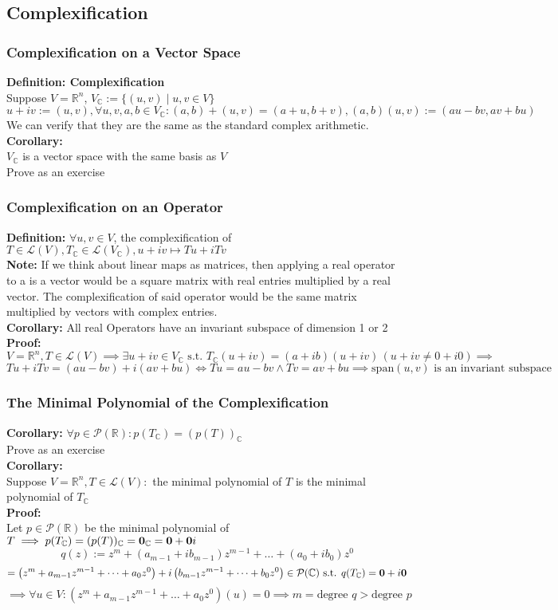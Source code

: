 \documentclass{article}
\newcommand{\R}{\mathbb{R}}
\newcommand{\st}{\mbox{ s.t. }}
\newcommand{\0}{{\bf{0}}}
\begin{document}
\subsection{Complexification}
\subsubsection{Complexification on a Vector Space}
\textbf{Definition: Complexification}\\
Suppose $V=\R^n$, $V_\mathbb{C}:=\{(u,v)\mid u,v\in V\}$
$$u+iv:=(u,v),\forall u,v,a,b\in V_\mathbb{C}:(a,b)+(u,v)=(a+u,b+v),(a,b)(u,v):=(au-bv,av+bu)$$
We can verify that they are the same as the standard complex arithmetic.\\
\textbf{Corollary:}\\
$V_\mathbb{C}$ is a vector space with the same basis as $V$\\
\null\hfill{Prove as an exercise}
\subsubsection{Complexification on an Operator}
\textbf{Definition:}
$\forall u,v\in V$, the complexification of $T\in\mathcal{L}(V),T_\mathbb{C}\in\mathcal{L}(V_\mathbb{C}),u+iv\mapsto Tu+iTv$\\
\textbf{Note:} If we think about linear maps as matrices, then applying a real operator to a is a vector would be a square matrix with real entries multiplied by a real vector. The complexification of said operator would be the same matrix multiplied by vectors with complex entries.\\
\textbf{Corollary: }All real Operators have an invariant subspace of dimension 1 or 2\\
\textbf{Proof:}
$$V=\R^n,T\in\mathcal{L}(V)\implies\exists u+iv\in V_\mathbb{C}\st T_\mathbb{C}(u+iv)=(a+ib)(u+iv)\,(u+iv\neq0+i0)\implies$$
$$Tu+iTv=(au-bv)+i(av+bu)\iff Tu=au-bv\land Tv=av+bu\implies\mbox{span}(u,v)\mbox{ is an invariant subspace}$$
\subsubsection{The Minimal Polynomial of the Complexification}
\textbf{Corollary:} $\forall p\in\mathcal{P}(\R):p(T_\mathbb{C})=(p(T))_\mathbb{C}$\\
\null\hfill{Prove as an exercise}\\
\textbf{Corollary:}\\
Suppose $V=\R^n,T\in\mathcal{L}(V):$ the minimal polynomial of $T$ is the minimal polynomial of $T_\mathbb{C}$\\
\textbf{Proof:}\\
Let $p\in\mathcal{P}(\R)$ be the minimal polynomial of $T\implies p(T_\mathbb{C})=(p(T))_\mathbb{C}=\0_\mathbb{C}=\0+\0i$\\
$$q(z):=z^m+(a_{m-1}+ib_{m-1})z^{m-1}+\dots+(a_0+ib_0)z^0$$
$$=\left(z^m+a_{m-1}z^{m-1}+\dots+a_0z^0\right)+i\left(b_{m-1}z^{m-1}+\dots+b_0z^0\right)\in\mathcal{P}(\mathbb{C})\st q(T_\mathbb{C})=\0+i\0$$
$$\implies\forall u\in V:\left(z^m+a_{m-1}z^{m-1}+\dots+a_0z^0\right)(u)=0\implies m=\mbox{degree }q>\mbox{degree }p$$
\end{document}

